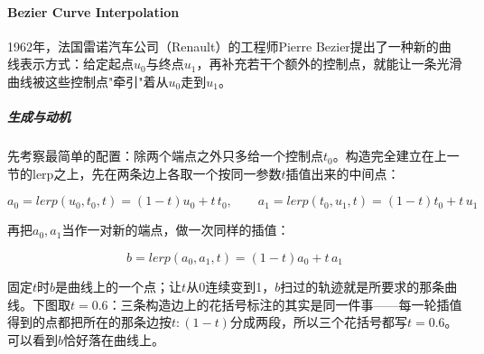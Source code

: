 \paragraph{Bezier Curve Interpolation}

1962年，法国雷诺汽车公司（Renault）的工程师Pierre Bezier提出了一种新的曲线表示方式：给定起点$u_0$与终点$u_1$，再补充若干个额外的控制点，就能让一条光滑曲线被这些控制点"牵引"着从$u_0$走到$u_1$。


\subparagraph{生成与动机}

先考察最简单的配置：除两个端点之外只多给一个控制点$t_0$。构造完全建立在上一节的lerp之上，先在两条边上各取一个按同一参数$t$插值出来的中间点：

\[
a_0 = lerp(u_0,t_0,t) = (1-t)u_0 + t\,t_0, \qquad
a_1 = lerp(t_0,u_1,t) = (1-t)t_0 + t\,u_1
\]

再把$a_0,a_1$当作一对新的端点，做一次同样的插值：

\[
b = lerp(a_0,a_1,t) = (1-t)a_0 + t\,a_1
\]

固定$t$时$b$是曲线上的一个点；让$t$从0连续变到1，$b$扫过的轨迹就是所要求的那条曲线。下图取$t=0.6$：三条构造边上的花括号标注的其实是同一件事——每一轮插值得到的点都把所在的那条边按$t:(1-t)$分成两段，所以三个花括号都写$t=0.6$。可以看到$b$恰好落在曲线上。

